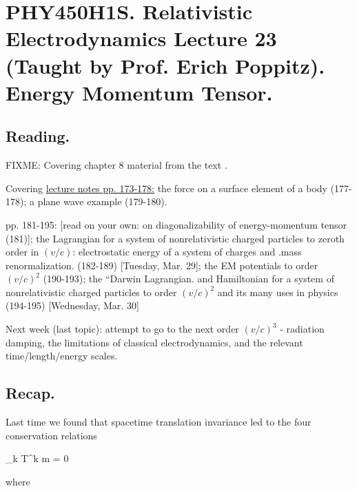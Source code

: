 
%

\chapter{PHY450H1S.  Relativistic Electrodynamics Lecture 23 (Taught by Prof. Erich Poppitz).  Energy Momentum Tensor.}
\label{chap:relativisticElectrodynamicsL23}
{}
\date{Mar 23, 2011}

\beginArtNoToc

\section{Reading.}

FIXME:
Covering chapter 8 material from the text \cite{landau1980classical}.

Covering \href{http://www.physics.utoronto.ca/~poppitz/epoppitz/PHY450_files/RelEMpp166-180.pdf}{lecture notes pp. 173-178:} the force on a surface element of a body (177-178); a plane wave example (179-180).

pp. 181-195: [read on your own: on diagonalizability of energy-momentum tensor (181)]; the Lagrangian for a system of nonrelativistic charged particles to zeroth order in $(v/c)$: electrostatic energy of a system of charges and .mass renormalization. (182-189) [Tuesday, Mar. 29]; the EM potentials to order $(v/c)^2$ (190-193); the ``Darwin Lagrangian.  and Hamiltonian for a system of nonrelativistic charged particles to order $(v/c)^2$ and its many uses in physics (194-195) [Wednesday, Mar. 30]

Next week (last topic): attempt to go to the next order $(v/c)^3$ - radiation damping, the limitations of classical electrodynamics, and the relevant time/length/energy scales.

\section{Recap.}

Last time we found that spacetime translation invariance led to the four conservation relations

\partial_k T^{k m} = 0

where

